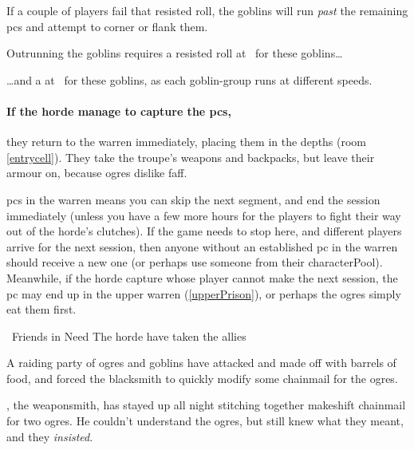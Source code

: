 If a couple of players fail that resisted  roll, the goblins will run \emph{past} the remaining \glspl{pc} and attempt to corner or flank them.%

\goblin

Outrunning the goblins requires a resisted  roll at \tn\ for these goblins\ldots

\goblin

\ldots and a  at \tn\ for these goblins, as each goblin-group runs at different speeds.

\goblin

\paragraph{If the horde manage to capture the \glspl{pc},}
they return to the \gls{warren} immediately, placing them in the depths (room \vref{entrycell}).
They take the troupe's weapons and backpacks, but leave their armour on, because \glspl{ogre} dislike faff.

\Glspl{pc} in the \gls{warren} means you can skip the next \gls{segment}, and end the session immediately (unless you have a few more hours for the players to fight their way out of the horde's clutches).
If the game needs to stop here, and different players arrive for the next session, then anyone without an established \gls{pc} in the \gls{warren} should receive a new one (or perhaps use someone from their \gls{characterPool}).
Meanwhile, if the horde capture  whose player cannot make the next session, the \gls{pc} may end up in the upper warren (\vref{upperPrison}), or perhaps the \glspl{ogre} simply eat them first.


{~Friends in Need}%
{The horde have taken the  allies}%

\begin{exampletext}
  A raiding party of \glspl{ogre} and goblins have attacked  and made off with barrels of food, and forced the blacksmith to quickly modify some chainmail for the \glspl{ogre}.
\end{exampletext}

\composeHumanName, the weaponsmith, has stayed up all night stitching together makeshift chainmail for two \glspl{ogre}.
He couldn't understand the \glspl{ogre}, but still knew what they meant, and they \emph{insisted}.

